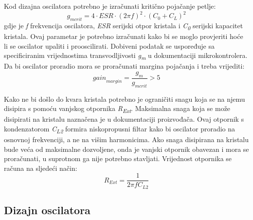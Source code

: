 Kod dizajna oscilatora potrebno je izračunati kritično pojačanje petlje:
\begin{equation} \label{eq:GMCRIT}
    g_{mcrit}=4\cdot ESR \cdot {(2\pi f)}^2\cdot {(C_0 + C_L)}^2
\end{equation}
gdje je \textit{f} frekvencija oscilatora, \textit{ESR} serijski otpor kristala i \textit{C\textsubscript{0}} serijski kapacitet kristala. Ovaj parametar je potrebno izračunati kako bi se moglo provjeriti hoće li se oscilator upaliti i prooscilirati. Dobiveni podatak se uspoređuje sa specificiranim vrijednostima transvodljivosti \textit{g\textsubscript{m}} u dokumentaciji mikrokontrolera. Da bi oscilator proradio mora se proračunati margina pojačanja i treba vrijediti:
\begin{equation} \label{eq:GMARGIN}
    {gain}_{margin}=\frac{g_m}{g_{mcrit}}>5
\end{equation}

Kako ne bi došlo do kvara kristala potrebno je ograničiti snagu koja se na njemu disipira s pomoću vanjskog otpornika \textit{R\textsubscript{Ext}}. Maksimalna snaga koja se može disipirati na kristalu naznačena je u dokumentaciji proizvođača. Ovaj otpornik s kondenzatorom \textit{C\textsubscript{L2}} formira niskopropusni filtar kako bi oscilator proradio na osnovnoj frekvenciji, a ne na višim harmonicima. Ako snaga disipirana na kristalu bude veća od maksimalne dozvoljene, onda je vanjski otpornik obavezan i mora se proračunati, u suprotnom ga nije potrebno stavljati. Vrijednost otpornika se računa na sljedeći način:
\begin{equation} \label{eq:REXT}
    R_{Ext}=\frac{1}{2\pi f C_{L2}}
\end{equation}

\subsection{Dizajn oscilatora}

